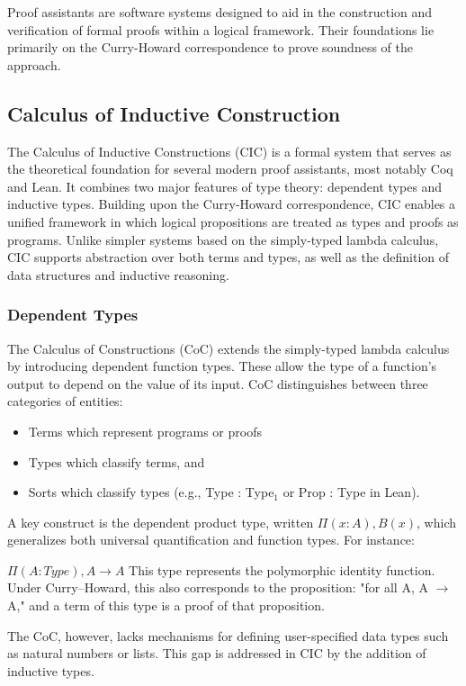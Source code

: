 \documentclass[12pt,a4paper,twoside]{book}
\begin{document}
Proof assistants are software systems designed to aid in the construction and verification of formal proofs within a logical framework. Their foundations lie primarily on the Curry-Howard correspondence to prove soundness of the approach.
\subsection{Calculus of Inductive Construction}
The Calculus of Inductive Constructions (CIC) is a formal system that serves as the theoretical foundation for several modern proof assistants, most notably Coq and Lean.
It combines two major features of type theory: dependent types and inductive types. Building upon the Curry-Howard correspondence, CIC enables a unified framework in which logical propositions are treated as types and proofs as programs. Unlike simpler systems based on the simply-typed lambda calculus, CIC supports abstraction over both terms and types, as well as the definition of data structures and inductive reasoning.
\subsubsection{Dependent Types}
The Calculus of Constructions (CoC) extends the simply-typed lambda calculus by introducing dependent function types. These allow the type of a function's output to depend on the value of its input. CoC distinguishes between three categories of entities:
\begin{itemize}
	\item{Terms} which represent programs or proofs
	\item{Types} which classify terms, and
	\item{Sorts} which classify types (e.g., Type : Type$_1$ or Prop : Type in Lean).
\end{itemize}

A key construct is the dependent product type, written $\Pi (x : A), B(x)$, which generalizes both universal quantification and function types. For instance:

$\Pi (A : Type), A \rightarrow A$
This type represents the polymorphic identity function. Under Curry–Howard, this also corresponds to the proposition: "for all A, A $\rightarrow$ A," and a term of this type is a proof of that proposition.

The CoC, however, lacks mechanisms for defining user-specified data types such as natural numbers or lists. This gap is addressed in CIC by the addition of inductive types.
\end{document}
